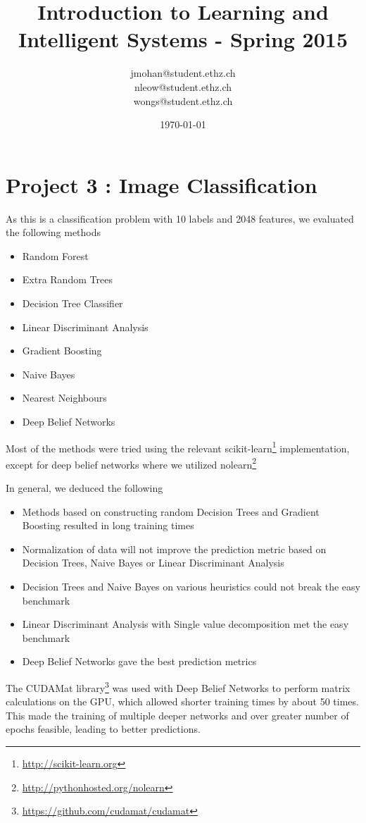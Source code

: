 \documentclass[a4paper, 11pt]{article}
\title{Introduction to Learning and Intelligent Systems - Spring 2015}
\author{jmohan@student.ethz.ch\\ nleow@student.ethz.ch\\ wongs@student.ethz.ch\\}
\date{\today}
\begin{document}
\maketitle

\section*{Project 3 : Image Classification}

As this is a classification problem with 10 labels and 2048 features, we evaluated the following methods

\begin{itemize}
  \item Random Forest
  \item Extra Random Trees
  \item Decision Tree Classifier
  \item Linear Discriminant Analysis
  \item Gradient Boosting
  \item Naive Bayes
  \item Nearest Neighbours
  \item Deep Belief Networks
\end{itemize}

Most of the methods were tried using the relevant scikit-learn\footnote{\url{http://scikit-learn.org}} implementation, except for deep belief networks where we utilized nolearn\footnote{\url{http://pythonhosted.org/nolearn}}

In general, we deduced the following
\begin{itemize}
  \item Methods based on constructing random Decision Trees and Gradient Boosting resulted in long training times
  \item Normalization of data will not improve the prediction metric based on Decision Trees, Naive Bayes or Linear Discriminant Analysis
  \item Decision Trees and Naive Bayes on various heuristics could not break the easy benchmark
  \item Linear Discriminant Analysis with Single value decomposition met the easy benchmark
  \item Deep Belief Networks gave the best prediction metrics
\end{itemize}

The CUDAMat library\footnote{\url{https://github.com/cudamat/cudamat}} was used with Deep Belief Networks to perform matrix calculations on the GPU, which allowed shorter training times by about 50 times. This made the training of multiple deeper networks and over greater number of epochs feasible, leading to better predictions.
\end{document}
